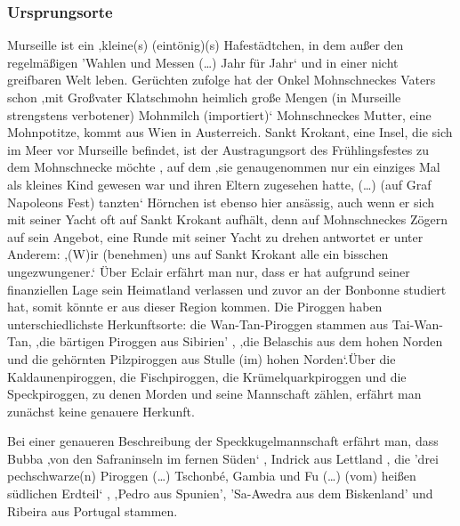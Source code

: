 {\subsubsection{Ursprungsorte}

Murseille ist ein ‚kleine(s) (eintönig)(s) Hafestädtchen, in dem außer den regelmäßigen 'Wahlen und Messen (…) Jahr für Jahr‘ \cite[S. 10[{pir} nichts außergewöhnliches passiert. Die Bewohner leben sicher ‚in häuslicher Geborgenheit‘ und erzählen sich höchstens Gruselgeschichten von ‚wilden Piroggenpiraten, (die als) etwas Fernes und Sagenhaftes (gelten)‘ \cite[S.10]{pir} und in einer nicht greifbaren Welt leben. Gerüchten zufolge hat der Onkel Mohnschneckes Vaters schon ‚mit Großvater Klatschmohn heimlich große Mengen (in Murseille strengstens verbotener) Mohnmilch (importiert)‘\cite[S.14]{pir} Mohnschneckes Mutter, eine Mohnpotitze, kommt aus Wien in Austerreich. \cite[S. 13]{pir} Sankt Krokant, eine Insel, die sich im Meer vor Murseille befindet, ist der Austragungsort des Frühlingsfestes zu dem Mohnschnecke möchte \cite[S.17]{pir}, auf dem ‚sie genaugenommen nur ein einziges Mal als kleines Kind gewesen war und ihren Eltern zugesehen hatte, (…) (auf Graf Napoleons Fest) tanzten‘ \cite[S.521]{pir} 
Hörnchen ist ebenso hier ansässig, auch wenn er sich mit seiner Yacht oft auf Sankt Krokant aufhält, denn auf Mohnschneckes Zögern auf sein Angebot, eine Runde mit seiner Yacht zu drehen antwortet er unter Anderem: ‚(W)ir (benehmen) uns auf Sankt Krokant alle ein bisschen ungezwungener.‘\cite[S.25]{pir} 
Über Eclair erfährt man nur, dass er hat aufgrund seiner finanziellen Lage sein Heimatland verlassen und zuvor an der Bonbonne studiert hat, somit könnte er aus dieser Region kommen. \cite[S.15f]{pir}
Die Piroggen haben unterschiedlichste Herkunftsorte: die Wan-Tan-Piroggen stammen aus Tai-Wan-Tan, \cite[S.8]{pir}
 ‚die bärtigen Piroggen aus Sibirien' \cite[S.8]{pir}, ‚die Belaschis aus dem hohen Norden \cite[S.9]{pir} und die gehörnten Pilzpiroggen aus Stulle (im) hohen Norden‘\cite[S.9]{pir}.Über die Kaldaunenpiroggen, die Fischpiroggen, die Krümelquarkpiroggen und die Speckpiroggen, zu denen Morden und seine Mannschaft zählen, erfährt man zunächst keine genauere Herkunft. \cite[S.9f]{pir}

Bei einer genaueren Beschreibung der Speckkugelmannschaft erfährt man, dass Bubba ‚von den Safraninseln im fernen Süden‘ \cite[S.46]{pir}, Indrick aus Lettland \cite[S.46f]{pir}, die 'drei pechschwarze(n) Piroggen (…) Tschonbé, Gambia und Fu (…) (vom) heißen südlichen Erdteil‘ \cite[S.47]{pir}, ‚Pedro aus Spunien'\cite[S.47]{pir}, 'Sa-Awedra aus dem Biskenland' \cite[S.47]{pir} und Ribeira aus Portugal \cite[S.47]{pir} stammen.


}
